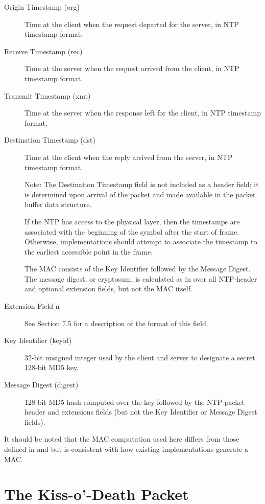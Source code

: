 \begin{description}
\item[Origin Timestamp (org)] Time at the client when the request departed
for the server, in NTP timestamp format.

\item[Receive Timestamp (rec)] Time at the server when the request arrived
from the client, in NTP timestamp format.

\item[Transmit Timestamp (xmt)] Time at the server when the response left
for the client, in NTP timestamp format.

\item[Destination Timestamp (dst)] Time at the client when the reply
arrived from the server, in NTP timestamp format.

Note: The Destination Timestamp field is not included as a header
field; it is determined upon arrival of the packet and made available
in the packet buffer data structure.

If the NTP has access to the physical layer, then the timestamps are
associated with the beginning of the symbol after the start of frame.
Otherwise, implementations should attempt to associate the timestamp
to the earliest accessible point in the frame.

The MAC consists of the Key Identifier followed by the Message
Digest. The message digest, or cryptosum, is calculated as in
\cite{RFC1321} over all NTP-header and optional extension fields, but not
the MAC itself.

\item[Extension Field n] See Section 7.5 for a description of the format of
this field.

\item[Key Identifier (keyid)] 32-bit unsigned integer used by the client
and server to designate a secret 128-bit MD5 key.

\item[Message Digest (digest)] 128-bit MD5 hash computed over the key
followed by the NTP packet header and extensions fields (but not the
Key Identifier or Message Digest fields).

\end{description}

It should be noted that the MAC computation used here differs from
those defined in \cite{RFC1305} and \cite{RFC4330} but is consistent with how
existing implementations generate a MAC.

\section{The Kiss-o’-Death Packet}

